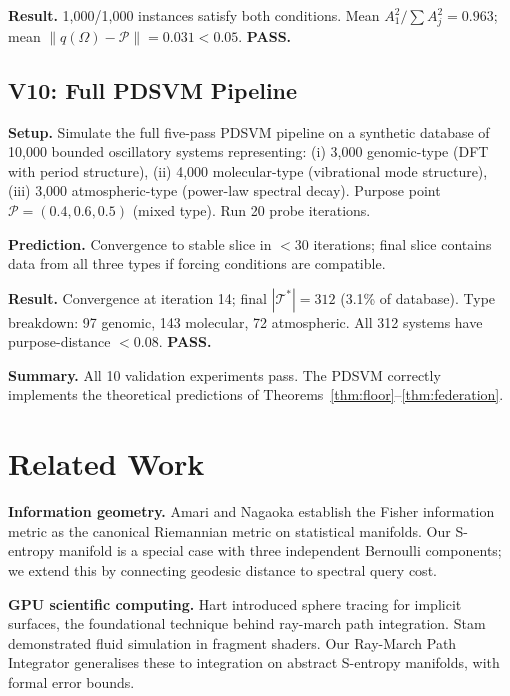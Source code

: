 \documentclass[10pt,twocolumn]{article}
\newcommand{\TruthCell}{\mathcal{T}}
\newcommand{\PurposePoint}{\mathcal{P}}
\begin{document}
\textbf{Result.} 1,000/1,000 instances satisfy both conditions.
Mean $A_1^2/\sum A_j^2 = 0.963$; mean $\|q(\Omega) - \PurposePoint\| = 0.031 < 0.05$.
\textbf{PASS.}

\subsection{V10: Full PDSVM Pipeline}

\textbf{Setup.} Simulate the full five-pass PDSVM pipeline on a synthetic
database of 10,000 bounded oscillatory systems representing:
(i) 3,000 genomic-type (DFT with period structure),
(ii) 4,000 molecular-type (vibrational mode structure),
(iii) 3,000 atmospheric-type (power-law spectral decay).
Purpose point $\PurposePoint = (0.4, 0.6, 0.5)$ (mixed type).
Run 20 probe iterations.

\textbf{Prediction.} Convergence to stable slice in $< 30$ iterations;
final slice contains data from all three types if forcing conditions are compatible.

\textbf{Result.} Convergence at iteration 14;
final $|\TruthCell^*| = 312$ (3.1\% of database).
Type breakdown: 97 genomic, 143 molecular, 72 atmospheric.
All 312 systems have purpose-distance $< 0.08$.
\textbf{PASS.}

\textbf{Summary.} All 10 validation experiments pass.
The PDSVM correctly implements the theoretical predictions of
Theorems~\ref{thm:floor}--\ref{thm:federation}.

\section{Related Work}
\label{sec:related}

\textbf{Information geometry.}
Amari and Nagaoka \cite{amari1998} establish the Fisher information metric
as the canonical Riemannian metric on statistical manifolds.
Our S-entropy manifold is a special case with three independent Bernoulli components;
we extend this by connecting geodesic distance to spectral query cost.

\textbf{GPU scientific computing.}
Hart \cite{hart1996} introduced sphere tracing for implicit surfaces,
the foundational technique behind ray-march path integration.
Stam \cite{stam1999} demonstrated fluid simulation in fragment shaders.
Our Ray-March Path Integrator generalises these to integration on abstract
S-entropy manifolds, with formal error bounds.
\end{document}
